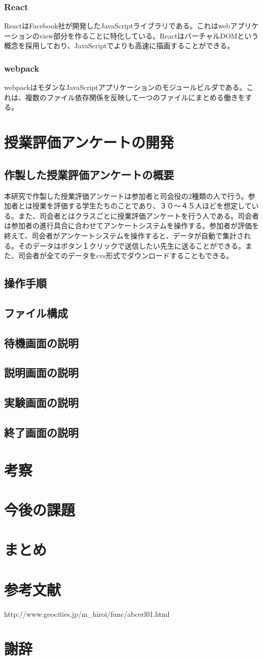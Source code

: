 \documentclass[11pt,a4paper]{jsarticle}
\begin{document}
\subsubsection{React}
ReactはFacebook社が開発したJavaScriptライブラリである。これはwebアプリケーションのview部分を作ることに特化している。ReactはバーチャルDOMという概念を採用しており、JavaScriptでよりも高速に描画することができる。
\subsubsection{webpack}
webpackはモダンなJavaScriptアプリケーションのモジュールビルダである。これは、複数のファイル依存関係を反映して一つのファイルにまとめる働きをする。
\section{授業評価アンケートの開発}
\subsection{作製した授業評価アンケートの概要}
本研究で作製した授業評価アンケートは参加者と司会役の2種類の人で行う。参加者とは授業を評価する学生たちのことであり、３０～４５人ほどを想定している。また、司会者とはクラスごとに授業評価アンケートを行う人である。司会者は参加者の進行具合に合わせてアンケートシステムを操作する。参加者が評価を終えて、司会者がアンケートシステムを操作すると、データが自動で集計される。そのデータはボタン１クリックで送信したい先生に送ることができる。また、司会者が全てのデータをcvs形式でダウンロードすることもできる。
\subsection{操作手順}
\subsection{ファイル構成}
\subsection{待機画面の説明}
\subsection{説明画面の説明}
\subsection{実験画面の説明}
\subsection{終了画面の説明}
\section{考察}
\section{今後の課題}
\section{まとめ}
\section{参考文献}
http://www.geocities.jp/m_hiroi/func/abcerl01.html
\section{謝辞}
%
%
\end{document}
